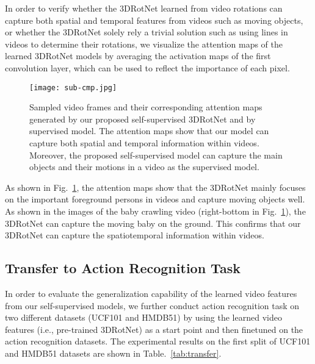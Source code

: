 \documentclass[10pt,twocolumn,letterpaper]{article}
\begin{document}
In order to verify whether the 3DRotNet learned from video rotations can capture both spatial and temporal features from videos such as moving objects, or whether the 3DRotNet solely rely a trivial solution such as using lines in videos to determine their rotations, we visualize the attention maps of the learned 3DRotNet models by averaging the activation maps of the first convolution layer, which can be used to reflect the importance of each pixel. 

\begin{figure}[t]
\begin{center}
\texttt{[image: sub-cmp.jpg]}
\end{center}
\vspace{-5pt}
\caption{Sampled video frames and their corresponding attention maps generated by our proposed self-supervised 3DRotNet and by supervised model. The attention maps show that our model can capture both spatial and temporal information within videos. Moreover, the proposed self-supervised model can capture the main objects and their motions in a video as the supervised model.}
\label{fig:attentionmap}
\end{figure}

As shown in Fig.~\ref{fig:attentionmap}, the attention maps show that the 3DRotNet mainly focuses on the important foreground persons in videos and capture moving objects well. As shown in the images of the baby crawling video (right-bottom in Fig.~\ref{fig:attentionmap}), the 3DRotNet can capture the moving baby on the ground. This confirms that our 3DRotNet can capture the spatiotemporal information within videos.



\subsection{Transfer to Action Recognition Task}

In order to evaluate the generalization capability of the learned video features from our self-supervised models, we further conduct action recognition task on two different datasets (UCF101 and HMDB51) by using the learned video features (i.e., pre-trained 3DRotNet) as a start point and then finetuned on the action recognition datasets. The experimental results on the first split of UCF101 and HMDB51 datasets are shown in Table.~\ref{tab:transfer}.
\end{document}
